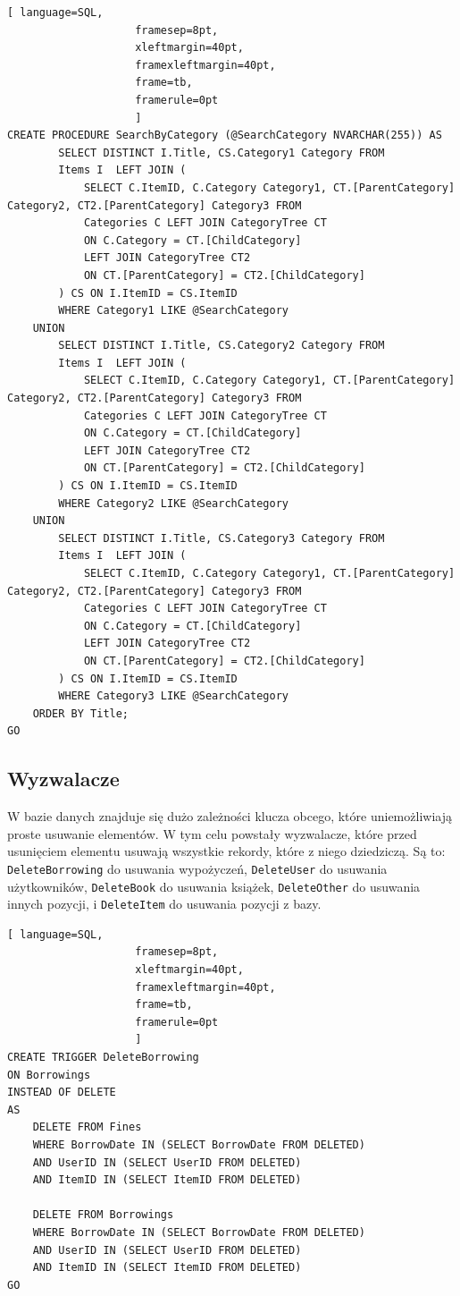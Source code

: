 \documentclass{article}
\renewcommand\t\texttt
\begin{document}
\begin{lstlisting}[ language=SQL,
                    framesep=8pt,
                    xleftmargin=40pt,
                    framexleftmargin=40pt,
                    frame=tb,
                    framerule=0pt
                    ]
CREATE PROCEDURE SearchByCategory (@SearchCategory NVARCHAR(255)) AS 
		SELECT DISTINCT I.Title, CS.Category1 Category FROM
		Items I  LEFT JOIN (
			SELECT C.ItemID, C.Category Category1, CT.[ParentCategory] Category2, CT2.[ParentCategory] Category3 FROM
			Categories C LEFT JOIN CategoryTree CT
			ON C.Category = CT.[ChildCategory]
			LEFT JOIN CategoryTree CT2
			ON CT.[ParentCategory] = CT2.[ChildCategory]
		) CS ON I.ItemID = CS.ItemID
		WHERE Category1 LIKE @SearchCategory
	UNION
		SELECT DISTINCT I.Title, CS.Category2 Category FROM
		Items I  LEFT JOIN (
			SELECT C.ItemID, C.Category Category1, CT.[ParentCategory] Category2, CT2.[ParentCategory] Category3 FROM
			Categories C LEFT JOIN CategoryTree CT
			ON C.Category = CT.[ChildCategory]
			LEFT JOIN CategoryTree CT2
			ON CT.[ParentCategory] = CT2.[ChildCategory]
		) CS ON I.ItemID = CS.ItemID
		WHERE Category2 LIKE @SearchCategory
	UNION
		SELECT DISTINCT I.Title, CS.Category3 Category FROM
		Items I  LEFT JOIN (
			SELECT C.ItemID, C.Category Category1, CT.[ParentCategory] Category2, CT2.[ParentCategory] Category3 FROM
			Categories C LEFT JOIN CategoryTree CT
			ON C.Category = CT.[ChildCategory]
			LEFT JOIN CategoryTree CT2
			ON CT.[ParentCategory] = CT2.[ChildCategory]
		) CS ON I.ItemID = CS.ItemID
		WHERE Category3 LIKE @SearchCategory 
	ORDER BY Title;
GO
\end{lstlisting}

\subsection{Wyzwalacze}

W bazie danych znajduje się dużo zależności klucza obcego, które uniemożliwiają proste usuwanie elementów. W tym celu powstały wyzwalacze, które przed usunięciem elementu usuwają wszystkie rekordy, które z niego dziedziczą. Są to: \t{DeleteBorrowing} do usuwania wypożyczeń, \t{DeleteUser} do usuwania użytkowników, \t{DeleteBook} do usuwania książek, \t{DeleteOther} do usuwania innych pozycji, i \t{DeleteItem} do usuwania pozycji z bazy.

\begin{lstlisting}[ language=SQL,
                    framesep=8pt,
                    xleftmargin=40pt,
                    framexleftmargin=40pt,
                    frame=tb,
                    framerule=0pt
                    ]
CREATE TRIGGER DeleteBorrowing
ON Borrowings
INSTEAD OF DELETE
AS
	DELETE FROM Fines
	WHERE BorrowDate IN (SELECT BorrowDate FROM DELETED)
	AND UserID IN (SELECT UserID FROM DELETED)
	AND ItemID IN (SELECT ItemID FROM DELETED)

	DELETE FROM Borrowings
	WHERE BorrowDate IN (SELECT BorrowDate FROM DELETED)
	AND UserID IN (SELECT UserID FROM DELETED)
	AND ItemID IN (SELECT ItemID FROM DELETED)
GO
\end{lstlisting}
\end{document}
